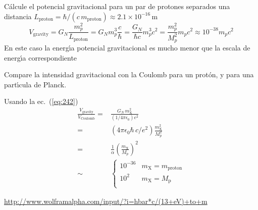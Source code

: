 \begin{example}
  C\'alcule el potencial gravitacional para un par de protones separados una distancia  $L_{\text{proton}}=\hbar/(c\, m_{\text{proton}})\approx2.1\times10^{-16}\,\text{m}$
\begin{equation}
    V_{\text{gravity}}=G_N\frac{m_p^2}{L_{\text{proton}}}=G_N m_p^3\frac{c}{\hbar}=\frac{G_N}{\hbar c}m_p^3c^2=\frac{m_p^2}{M_p^2}m_pc^2\approx10^{-38}m_pc^2
\end{equation}
En este caso la energ\'\i a potencial gravitacional es mucho menor que la escala de energ\'\i a correspondiente
\end{example}
\begin{example}
Compare la intensidad gravitacional con la Coulomb para un prot\'on, y para una part\'\i cula de Planck.

Usando la ec.~(\ref{eq:242})
\begin{align}
\frac{V_{\text{gravity}}}{V_{\text{Coulomb}}}=&\frac{G_N\,m_{\text{X}}^2}{(1/4\pi\epsilon_0)e^2}\nonumber\\
=&(4\pi\epsilon_0\hbar\,c/e^2)\frac{m_{\text{X}}^2}{M_p^2}\nonumber\\
=&\frac{1}{\alpha}\left(\frac{m_{\text{X}}}{M_p}\right)^2\nonumber\\
\sim&
\begin{cases}
  10^{-36}&m_{\text{X}}=m_{\text{proton}}\\
  10^{2}&m_{\text{X}}=M_{\text{p}}\\
\end{cases}
\end{align}
\end{example}

\url{http://www.wolframalpha.com/input/?i=hbar*c/(13+eV)+to+m}


